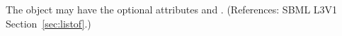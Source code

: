 The  object may have the optional attributes  and
. (References: SBML L3V1 Section~\ref{sec:listof}.)
